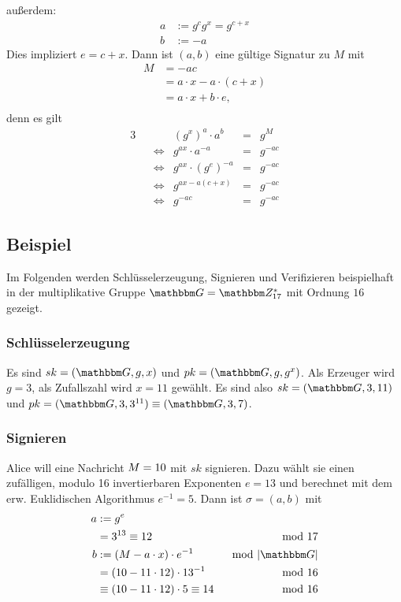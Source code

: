 \begin{description}
  außerdem:
  \begin{align*} a &:= g^cg^x = g^{c+x}\\ b &:= -a
  \end{align*} Dies impliziert $e=c+x$.  Dann ist $(a, b)$ eine
  gültige Signatur zu $M$ mit
  \begin{align*} M &= -ac\\ &= a \cdot x - a \cdot (c + x)\\ &= a
                                                               \cdot x + b \cdot e,\\
  \end{align*} denn es gilt
  \begin{alignat*}{3} && & (g^x)^a\cdot a^b &= &g^M\\ &&
    \Leftrightarrow & g^{ax} \cdot a^{-a} &= &g^{-ac}\\ && \Leftrightarrow &
    g^{ax} \cdot (g^e)^{-a} &= &g^{-ac}\\ && \Leftrightarrow & g^{ax-a(c+x)}
    &= &g^{-ac}\\ && \Leftrightarrow & g^{-ac} &= &g^{-ac}
  \end{alignat*}
\end{description}
\subsection{Beispiel} Im Folgenden werden Schlüsselerzeugung,
Signieren und Verifizieren beispielhaft in der multiplikative Gruppe $\G
= \Z{17}^{*}$ mit Ordnung $16$ gezeigt.
\subsubsection*{Schlüsselerzeugung} Es sind $\skey = (\G, g, x)$
und $\pkey = (\G, g, g^x)$. Als Erzeuger wird $g=3$, als Zufallszahl
wird $x=11$ gewählt. Es sind also $\skey = (\G, 3, 11)$ und $\pkey =
(\G, 3, 3^{11})\equiv (\G, 3, 7)$.
\subsubsection*{Signieren} Alice will eine Nachricht $M =
10$ mit $sk$ signieren. Dazu wählt sie einen zufälligen, modulo 16
invertierbaren Exponenten $e= 13$ und berechnet mit dem
erw. Euklidischen Algorithmus $e^{-1}=5$. Dann ist $\sigma = (a, b)$ mit
\begin{align*} 
  a &:= g^e &\\ 
    &= 3^{13} \equiv 12 & \mod 17\\ 
  b &:= (\plaint-a \cdot x) \cdot e^{-1} & \mod |\G|\\
    &= (10 - 11 \cdot 12) \cdot 13^{-1} & \mod 16\\
    &\equiv (10 - 11\cdot 12) \cdot 5 \equiv 14 & \mod 16
\end{align*}

